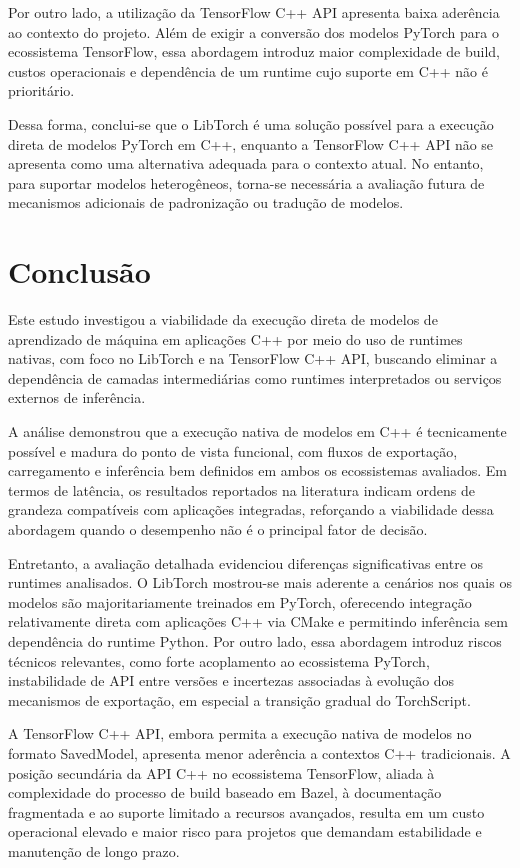 Por outro lado, a utilização da TensorFlow C++ API apresenta baixa aderência ao
contexto do projeto. Além de exigir a conversão dos modelos PyTorch para o ecossistema
TensorFlow, essa abordagem introduz maior complexidade de build, custos operacionais
e dependência de um runtime cujo suporte em C++ não é prioritário.

Dessa forma, conclui-se que o LibTorch é uma solução possível para a execução direta de modelos PyTorch em C++, enquanto a TensorFlow C++ API não se apresenta como uma alternativa adequada para o contexto atual. No entanto, para suportar modelos heterogêneos, torna-se necessária a avaliação futura de mecanismos adicionais de padronização ou tradução de modelos.

 \section{Conclusão}

Este estudo investigou a viabilidade da execução direta de modelos de aprendizado de
máquina em aplicações C++ por meio do uso de runtimes nativas, com foco no LibTorch e
na TensorFlow C++ API, buscando eliminar a dependência de camadas intermediárias como
runtimes interpretados ou serviços externos de inferência.

A análise demonstrou que a execução nativa de modelos em C++ é tecnicamente possível
e madura do ponto de vista funcional, com fluxos de exportação, carregamento e
inferência bem definidos em ambos os ecossistemas avaliados. Em termos de latência,
os resultados reportados na literatura indicam ordens de grandeza compatíveis com
aplicações integradas, reforçando a viabilidade dessa abordagem quando o desempenho
não é o principal fator de decisão.

Entretanto, a avaliação detalhada evidenciou diferenças significativas entre os
runtimes analisados. O LibTorch mostrou-se mais aderente a cenários nos quais os modelos
são majoritariamente treinados em PyTorch, oferecendo integração relativamente direta
com aplicações C++ via CMake e permitindo inferência sem dependência do runtime Python.
Por outro lado, essa abordagem introduz riscos técnicos relevantes, como forte
acoplamento ao ecossistema PyTorch, instabilidade de API entre versões e incertezas
associadas à evolução dos mecanismos de exportação, em especial a transição gradual do
TorchScript.

A TensorFlow C++ API, embora permita a execução nativa de modelos no formato SavedModel,
apresenta menor aderência a contextos C++ tradicionais. A posição secundária da API C++
no ecossistema TensorFlow, aliada à complexidade do processo de build baseado em Bazel,
à documentação fragmentada e ao suporte limitado a recursos avançados, resulta em um
custo operacional elevado e maior risco para projetos que demandam estabilidade e
manutenção de longo prazo.

